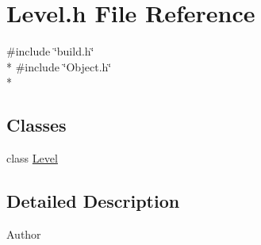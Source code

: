 \section{Level.\-h File Reference}
\label{_level_8h}
{\ttfamily \#include \char`\"{}build.\-h\char`\"{}}\\*
{\ttfamily \#include \char`\"{}Object.\-h\char`\"{}}\\*
\subsection*{Classes}
\begin{DoxyCompactItemize}
\item 
class \hyperlink{class_level}{Level}
\end{DoxyCompactItemize}


\subsection{Detailed Description}
\begin{DoxyAuthor}{Author}

\end{DoxyAuthor}
